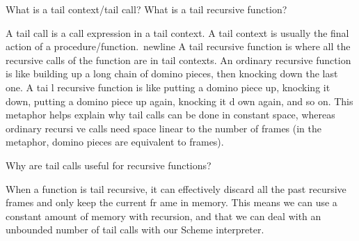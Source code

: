 \begin{blocksection}
\question What is a tail context/tail call? What is a tail recursive function?

\begin{solution}[0.5in]
A tail call is a call expression in a tail context. A tail context is usually the final action of a procedure/function.
\newline
A tail recursive function is where all the recursive calls of the function are in tail contexts. \newline
\newline
An ordinary recursive function is like building up a long chain of domino pieces, then knocking down the last one. A tai
l recursive function is like putting a domino piece up, knocking it down, putting a domino piece up again, knocking it d
own again, and so on. This metaphor helps explain why tail calls can be done in constant space, whereas ordinary recursi
ve calls need space linear to the number of frames (in the metaphor, domino pieces are equivalent to frames).
\end{solution}

\question Why are tail calls useful for recursive functions?

\begin{solution}[0.5in]
When a function is tail recursive, it can effectively discard all the past recursive frames and only keep the current fr
ame in memory. This means we can use a constant amount of memory with recursion, and that we can deal with an unbounded
number of tail calls with our Scheme interpreter.
\end{solution}

\end{blocksection}
